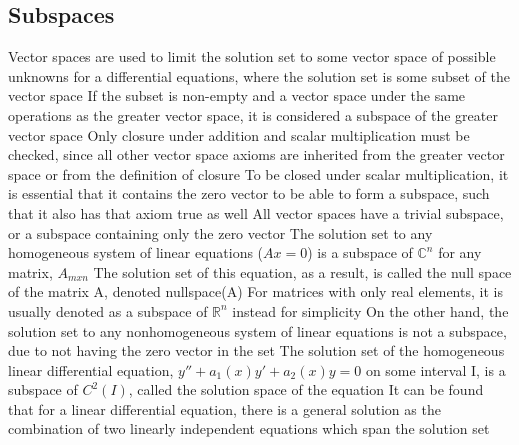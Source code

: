 \documentclass[11 pt, twoside]{article}
\newenvironment{outline*}
{
	\begin{outline}[enumerate]
	}
	{\end{outline}
}
\begin{document}
\subsection{Subspaces}
\begin{outline*}
\1 Vector spaces are used to limit the solution set to some vector space of possible unknowns for a differential equations, where the solution set is some subset of the vector space
\2 If the subset is non-empty and a vector space under the same operations as the greater vector space, it is considered a subspace of the greater vector space
\2 Only closure under addition and scalar multiplication must be checked, since all other vector space axioms are inherited from the greater vector space or from the definition of closure
\3 To be closed under scalar multiplication, it is essential that it contains the zero vector to be able to form a subspace, such that it also has that axiom true as well
\1 All vector spaces have a trivial subspace, or a subspace containing only the zero vector
\1 The solution set to any homogeneous system of linear equations ($Ax = 0$) is a subspace of $\mathbb{C}^n$ for any matrix, $A_{mxn}$
\2 The solution set of this equation, as a result, is called the null space of the matrix A, denoted nullspace(A)
\2 For matrices with only real elements, it is usually denoted as a subspace of $\mathbb{R}^n$ instead for simplicity
\2 On the other hand, the solution set to any nonhomogeneous system of linear equations is not a subspace, due to not having the zero vector in the set
\1 The solution set of the homogeneous linear differential equation, $y'' + a_1(x)y' + a_2(x)y = 0$ on some interval I, is a subspace of $C^2(I)$, called the solution space of the equation
\2 It can be found that for a linear differential equation, there is a general solution as the combination of two linearly independent equations which span the solution set
\end{outline*}
\end{document}
